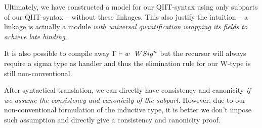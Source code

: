 Ultimately, we have constructed a model for our QIIT-syntax using only subparts of our QIIT-syntax -- without these linkages. This also justify the intuition -- a linkage is actually a module \textit{with universal quantification wrapping its fields to achieve late binding}. 

It is also possible to compile away ${ {\Gamma} \vdash {w} \ \ WSig^{n} }$ but the recursor will always require a sigma type as handler and thus the elimination rule for our W-type is still non-conventional.

After syntactical translation, we can directly have consistency and canonicity \textit{if we assume the consistency and canonicity of the subpart}. However, due to our non-conventional formulation of the inductive type, it is better we don't impose such assumption and directly give a consistency and canonicity proof.

